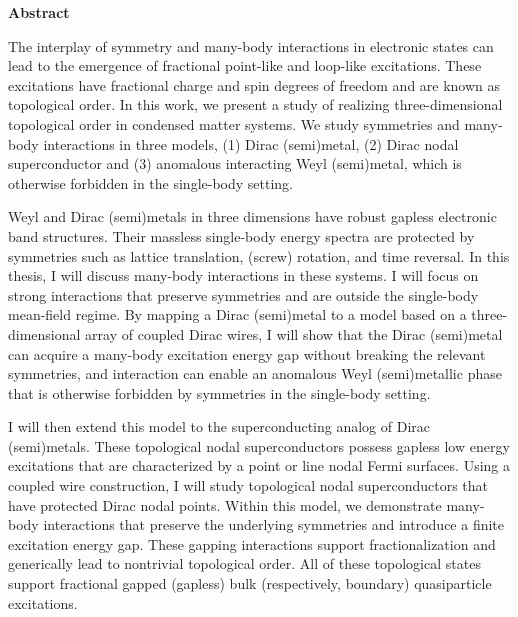 \begin{center}\textbf{Abstract}
\end{center}
The interplay of symmetry and many-body interactions in electronic states can lead to the emergence of fractional point-like and loop-like excitations. These excitations have fractional charge and spin degrees of freedom and are known as topological order. In this work, we present a study of realizing three-dimensional topological order in condensed matter systems. We study symmetries and many-body interactions in three models, (1) Dirac (semi)metal, (2) Dirac nodal superconductor and (3) anomalous interacting Weyl (semi)metal, which is otherwise forbidden in the single-body setting. 

Weyl and Dirac (semi)metals in three dimensions have robust gapless electronic band structures. Their massless single-body energy spectra are protected by symmetries such as lattice translation, (screw) rotation, and time reversal. In this thesis, I will discuss many-body interactions in these systems. I will focus on strong interactions that preserve symmetries and are outside the single-body mean-field regime. By mapping a Dirac (semi)metal to a model based on a three-dimensional array of coupled Dirac wires, I will show that the Dirac (semi)metal can acquire a many-body excitation energy gap without breaking the relevant symmetries, and interaction can enable an anomalous Weyl (semi)metallic phase that is otherwise forbidden by symmetries in the single-body setting. 

I will then extend this model to the superconducting analog of Dirac (semi)metals. These topological nodal superconductors possess gapless low energy excitations that are characterized by a point or line nodal Fermi surfaces. Using a coupled wire construction, I will study topological nodal superconductors that have protected Dirac nodal points. Within this model, we demonstrate many-body interactions that preserve the underlying symmetries and introduce a finite excitation energy gap. These gapping interactions support fractionalization and generically lead to nontrivial topological order. All of these topological states support fractional gapped (gapless) bulk (respectively, boundary) quasiparticle excitations.